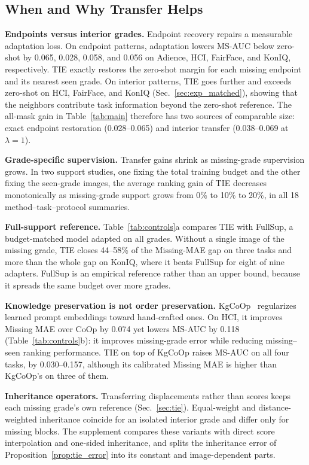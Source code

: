 \subsection{When and Why Transfer Helps}
\label{sec:exp_structure}

\noindent\textbf{Endpoints versus interior grades.}
Endpoint recovery repairs a measurable adaptation loss. On endpoint patterns, adaptation lowers MS-AUC below zero-shot by 0.065, 0.028, 0.058, and 0.056 on Adience, HCI, FairFace, and KonIQ, respectively. TIE exactly restores the zero-shot margin for each missing endpoint and its nearest seen grade. On interior patterns, TIE goes further and exceeds zero-shot on HCI, FairFace, and KonIQ (Sec.~\ref{sec:exp_matched}), showing that the neighbors contribute task information beyond the zero-shot reference.
The all-mask gain in Table~\ref{tab:main} therefore has two sources of comparable size: exact endpoint restoration (0.028--0.065) and interior transfer (0.038--0.069 at $\lambda=1$).

\noindent\textbf{Grade-specific supervision.}
Transfer gains shrink as missing-grade supervision grows.
In two support studies, one fixing the total training budget and the other fixing the seen-grade images, the average ranking gain of TIE decreases monotonically as missing-grade support grows from 0\% to 10\% to 20\%, in all 18 method--task--protocol summaries.

\noindent\textbf{Full-support reference.}
Table~\ref{tab:controls}a compares TIE with FullSup, a budget-matched model adapted on all grades.
Without a single image of the missing grade, TIE closes 44--58\% of the Missing-MAE gap on three tasks and more than the whole gap on KonIQ, where it beats FullSup for eight of nine adapters.
FullSup is an empirical reference rather than an upper bound, because it spreads the same budget over more grades.

\noindent\textbf{Knowledge preservation is not order preservation.}
KgCoOp~\cite{yao2023kgcoop} regularizes learned prompt embeddings toward hand-crafted ones.
On HCI, it improves Missing MAE over CoOp by 0.074 yet lowers MS-AUC by 0.118 (Table~\ref{tab:controls}b): it improves missing-grade error while reducing missing--seen ranking performance.
TIE on top of KgCoOp raises MS-AUC on all four tasks, by 0.030--0.157, although its calibrated Missing MAE is higher than KgCoOp's on three of them.

\noindent\textbf{Inheritance operators.}
Transferring displacements rather than scores keeps each missing grade's own reference (Sec.~\ref{sec:tie}).
Equal-weight and distance-weighted inheritance coincide for an isolated interior grade and differ only for missing blocks.
The supplement compares these variants with direct score interpolation and one-sided inheritance, and splits the inheritance error of Proposition~\ref{prop:tie_error} into its constant and image-dependent parts.

